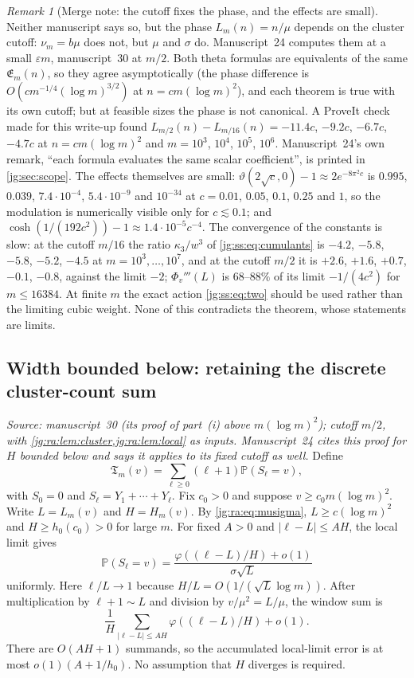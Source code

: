 \documentclass[11pt,a4paper]{article}
\theoremstyle{definition}\newaliascnt{definition}{theorem}
\theoremstyle{remark}\newaliascnt{remark}{theorem}
\newtheorem{remark}[remark]{Remark}
\newcommand{\ljP}{\mathbb P}
\begin{document}
\begin{remark}[Merge note: the cutoff fixes the phase, and the effects are small]
\label{jg:rem:cutoff}
Neither manuscript says so, but the phase $L_m(n)=n/\mu$ depends on the cluster
cutoff: $\nu_m=b\mu$ does not, but $\mu$ and $\sigma$ do. Manuscript~24 computes
them at a small $\varepsilon m$, manuscript~30 at $m/2$. Both theta formulas
are equivalents of the same $\mathfrak E_m(n)$, so they agree asymptotically
(the phase difference is $O(cm^{-1/4}(\log m)^{3/2})$ at $n=cm(\log m)^2$), and
each theorem is true with its own cutoff; but at feasible sizes the phase is
not canonical. A ProveIt check made for this write-up found
$L_{m/2}(n)-L_{m/16}(n)=-11.4c$, $-9.2c$, $-6.7c$, $-4.7c$ at $n=cm(\log m)^2$
and $m=10^3$, $10^4$, $10^5$, $10^6$. Manuscript~24's own remark,
``each formula evaluates the same scalar coefficient'', is printed in
\cref{jg:sec:scope}. The effects themselves are small:
$\vartheta(2\sqrt c,0)-1\approx2e^{-8\pi^2c}$ is $0.995$, $0.039$,
$7.4\cdot10^{-4}$, $5.4\cdot10^{-9}$ and $10^{-34}$ at $c=0.01$, $0.05$, $0.1$,
$0.25$ and $1$, so the modulation is numerically visible only for
$c\lesssim0.1$; and $\cosh(1/(192c^2))-1\approx1.4\cdot10^{-5}c^{-4}$. The
convergence of the constants is slow: at the cutoff $m/16$ the ratio
$\kappa_3/w^3$ of \eqref{jg:ss:eq:cumulants} is $-4.2$, $-5.8$, $-5.8$, $-5.2$,
$-4.5$ at $m=10^3,\ldots,10^7$, and at the cutoff $m/2$ it is $+2.6$, $+1.6$,
$+0.7$, $-0.1$, $-0.8$, against the limit $-2$; $\Phi_v'''(L)$ is $68$--$88\%$
of its limit $-1/(4c^2)$ for $m\le16384$. At finite $m$ the exact action
\eqref{jg:ss:eq:two} should be used rather than the limiting cubic weight. None
of this contradicts the theorem, whose statements are limits.
\end{remark}

\subsection{Width bounded below: retaining the discrete cluster-count sum}
\label{jg:sec:theta-proof}
\emph{Source: manuscript~30 (its proof of part~(i) above $m(\log m)^2$);
cutoff $m/2$, with \cref{jg:ra:lem:cluster,jg:ra:lem:local} as inputs.
Manuscript~24 cites this proof for $H$ bounded below and says it applies to its
fixed cutoff as well.} Define
\[
 \mathfrak T_m(v)=\sum_{\ell\ge0}(\ell+1)\ljP(S_\ell=v),
\]
with $S_0=0$ and $S_\ell=Y_1+\cdots+Y_\ell$. Fix $c_0>0$ and suppose
$v\ge c_0m(\log m)^2$. Write $L=L_m(v)$ and $H=H_m(v)$. By
\eqref{jg:ra:eq:musigma}, $L\ge c(\log m)^2$ and $H\ge h_0(c_0)>0$ for large
$m$. For fixed $A>0$ and $|\ell-L|\le AH$, the local limit gives
\[
 \ljP(S_\ell=v)
 =\frac{\varphi((\ell-L)/H)+o(1)}{\sigma\sqrt L}
\]
uniformly. Here $\ell/L\to1$ because $H/L=O(1/(\sqrt L\log m))$. After
multiplication by $\ell+1\sim L$ and division by $v/\mu^2=L/\mu$, the window
sum is
\begin{equation}\label{jg:tb:eq:windowsum}
 \frac1H\sum_{|\ell-L|\le AH}
       \varphi((\ell-L)/H)+o(1).
\end{equation}
There are $O(AH+1)$ summands, so the accumulated local-limit error is at most
$o(1)(A+1/h_0)$. No assumption that $H$ diverges is required.
\end{document}
